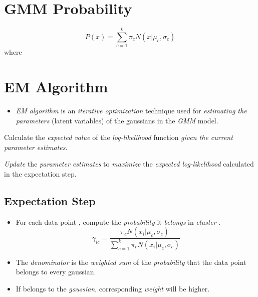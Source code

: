 \documentclass[
	number={6},
	title={Clustering}
]{cs584notes}
\begin{document}
\section{GMM Probability}\label{sec:gmm-probability}
\begin{equation}
	P(x) = \sum_{c=1}^{k} \pi_{c} N(x | \mu_{c}, \sigma_{c})
	\label{eq:gmm-probability}
\end{equation}
where 

\section{EM Algorithm}\label{sec:em-algorithm}
\begin{itemize}
	\item \emph{EM algorithm} is an \emph{iterative optimization} technique used for \emph{estimating the parameters} (latent variables) of the gaussians in the \emph{GMM} model.
\end{itemize}
\begin{description}[font=\emph]
	\item[Expectation step] Calculate the \emph{expected value} of the \emph{log-likelihood} function \emph{given the current parameter estimates}.
	\item[Maximization step] \emph{Update} the \emph{parameter estimates} to \emph{maximize} the \emph{expected log-likelihood} calculated in the expectation step.
\end{description}

\subsection{Expectation Step}\label{subsec:expectation-step}
\begin{itemize}
	\item For each data point , compute the \emph{probability} it \emph{belongs} in \emph{cluster} .
	\begin{equation}
		\gamma_{ic} = \frac{\pi_{c}N(x_{i} | \mu_{c}, \sigma_{c})}{\sum_{c=1}^{k}  \pi_{c}N(x_{i} | \mu_{c}, \sigma_{c})}
		\label{eq:expectation-step}
	\end{equation}
	\item The \emph{denominator} is the \emph{weighted sum} of the \emph{probability} that the data point  belongs to every gaussian.
	\item If  belongs to the  \emph{gaussian}, corresponding \emph{weight}  will be higher.
\end{itemize}
\end{document}
